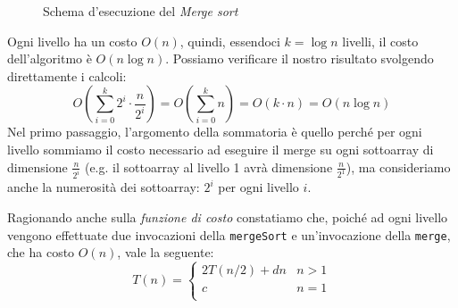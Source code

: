 \begin{figure}[hb]
\caption{Schema d'esecuzione del \emph{Merge sort}}
\end{figure}\noindent
Ogni livello ha un costo $O(n)$, quindi, essendoci $k=\log n$ livelli, il costo
dell'algoritmo è $O(n\log n)$. Possiamo verificare il nostro risultato
svolgendo direttamente i calcoli:
\[O\left(\sum_{i=0}^k2^i\cdot\frac{n}{2^i}\right)=O\left(\sum_{i=0}^kn\right)=
O(k\cdot n)=O(n\log n)\]
Nel primo passaggio, l'argomento della sommatoria è quello perché per ogni livello
sommiamo il costo necessario ad eseguire il merge su ogni sottoarray di dimensione
$\frac{n}{2^i}$ (e.g. il sottoarray al livello 1 avrà dimensione $\frac{n}{2^1}$),
ma consideriamo anche la numerosità dei sottoarray: $2^i$ per ogni livello $i$.

Ragionando anche sulla \emph{funzione di costo} constatiamo che, poiché ad ogni
livello vengono effettuate due invocazioni della \texttt{mergeSort} e
un'invocazione della \texttt{merge}, che ha costo $O(n)$, vale la seguente:
\[T(n)=\begin{cases}
    2T(n/2)+dn & n>1\\
    c & n=1\\
\end{cases}\]
